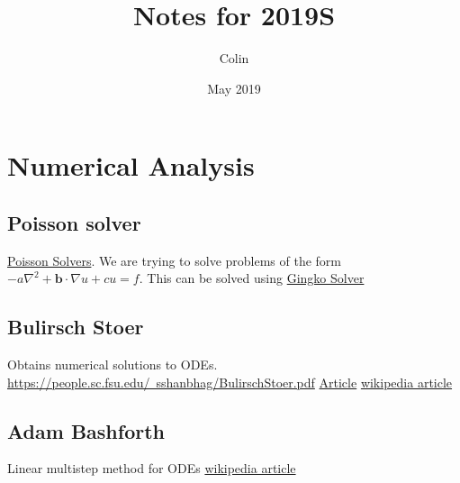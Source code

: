 \documentclass[12pt]{extarticle}
\title{Notes for 2019S}
\author{Colin}
\date{May 2019}
\newcommand{\<}{\langle}
\renewcommand{\>}{\rangle}
\theoremstyle{definition}
\begin{document}
\maketitle

\section{Numerical Analysis}
\subsection{Poisson solver}
\href{http://users.cs.northwestern.edu/~jet/Teach/2004_3spr_IBMR/poisson.pdf}{Poisson Solvers}.
We are trying to solve problems of the form $-a\nabla^2 +\bm{b}\cdot \nabla u + cu = f$. This can be solved using \href{https://github.com/ginkgo-project/ginkgo/wiki/Tutorial:-Building-a-2D-Poisson-Solver}{Gingko Solver}

\subsection{Bulirsch Stoer}
Obtains numerical solutions to ODEs.
\href{https://people.sc.fsu.edu/~sshanbhag/BulirschStoer.pdf}{https://people.sc.fsu.edu/~sshanbhag/BulirschStoer.pdf}
\href{http://web.mit.edu/ehliu/Public/Spring2006/18.304/implementation_bulirsch_stoer.pdf}{Article}
\href{https://en.wikipedia.org/wiki/Bulirsch%E2%80%93Stoer_algorithm}{wikipedia article}

\subsection{Adam Bashforth}
Linear multistep method for ODEs
\href{https://en.wikipedia.org/wiki/Linear_multistep_method#Adams%E2%80%93Bashforth_methods}{wikipedia article}
\end{document}
